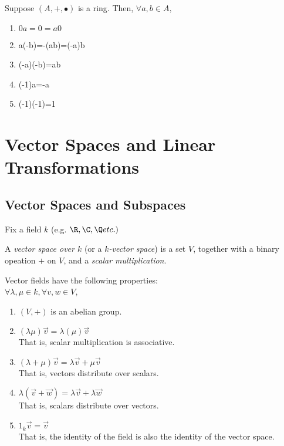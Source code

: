 \documentclass[a5paper]{article}
\begin{document}
\begin{proposition*}
Suppose $(A, +, \bullet)$ is a ring. Then, $\forall a,b \in A,$
\begin{enumerate}
\item $0a = 0 = a0$
\item a(-b)=-(ab)=(-a)b
\item (-a)(-b)=ab
\item (-1)a=-a
\item (-1)(-1)=1
\end{enumerate}
\end{proposition*}

\pagebreak

\section{Vector Spaces and Linear Transformations}

\subsection{Vector Spaces and Subspaces}

Fix a field $k$ (e.g. $\R, \C, \Q etc.)$

\begin{definition*}
A \emph{vector space over $k$} (or a \emph{$k$-vector space}) is a set $V$, together with a binary opeation $+$ on $V$, and a \emph{scalar multiplication}. 
\end{definition*}

Vector fields have the following properties:\\
$\forall \lambda, \mu \in k, \forall v,w \in V$,

\begin{enumerate}[label=(\roman*)]
\item $(V,+)$ is an abelian group. 
\item $(\lambda\mu)\vec{v}=\lambda(\mu)\vec{v}$\\
That is, scalar multiplication is associative. 
\item $(\lambda+\mu)\vec{v}=\lambda \vec{v}+ \mu \vec{v}$\\
That is, vectors distribute over scalars.  
\item $\lambda(\vec{v}+\vec{w})=\lambda \vec{v}+ \lambda \vec{w}$\\
That is, scalars distribute over vectors. 
\item $1_k \vec{v} = \vec{v}$\\
That is, the identity of the field is also the identity of the vector space. 
\end{enumerate}
\end{document}
